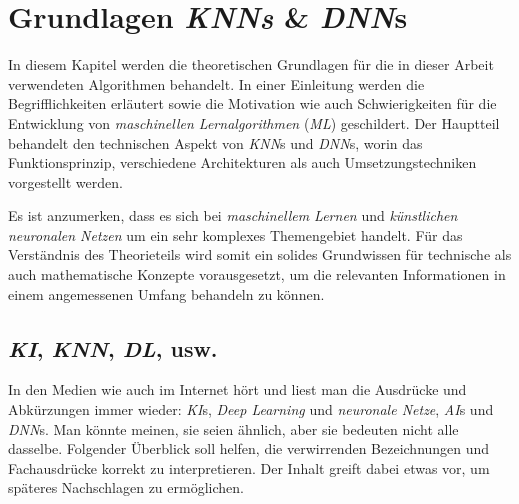 \section{Grundlagen \textit{KNNs} \& \textit{DNN}s}

In diesem Kapitel werden die theoretischen Grundlagen für die in dieser Arbeit verwendeten Algorithmen behandelt. In einer Einleitung werden die Begrifflichkeiten erläutert sowie die Motivation wie auch Schwierigkeiten für die Entwicklung von \textit{maschinellen Lernalgorithmen} (\textit{ML}) geschildert. Der Hauptteil behandelt den technischen Aspekt von \textit{KNN}s und \textit{DNN}s, worin das Funktionsprinzip, verschiedene Architekturen als auch Umsetzungstechniken vorgestellt werden.

Es ist anzumerken, dass es sich bei \textit{maschinellem Lernen} und \textit{künstlichen neuronalen Netzen} um ein sehr komplexes Themengebiet handelt. Für das Verständnis des Theorieteils wird somit ein solides Grundwissen für technische als auch mathematische Konzepte vorausgesetzt, um die relevanten Informationen in einem angemessenen Umfang behandeln zu können.

\subsection{\textit{KI}, \textit{KNN}, \textit{DL}, usw.}
In den Medien wie auch im Internet hört und liest man die Ausdrücke und Abkürzungen immer wieder: \textit{KI}s, \textit{Deep Learning} und \textit{neuronale Netze}, \textit{AI}s und \textit{DNN}s. Man könnte meinen, sie seien ähnlich, aber sie bedeuten nicht alle dasselbe. Folgender Überblick soll helfen, die verwirrenden Bezeichnungen und Fachausdrücke korrekt zu interpretieren. Der Inhalt greift dabei etwas vor, um späteres Nachschlagen zu ermöglichen.


